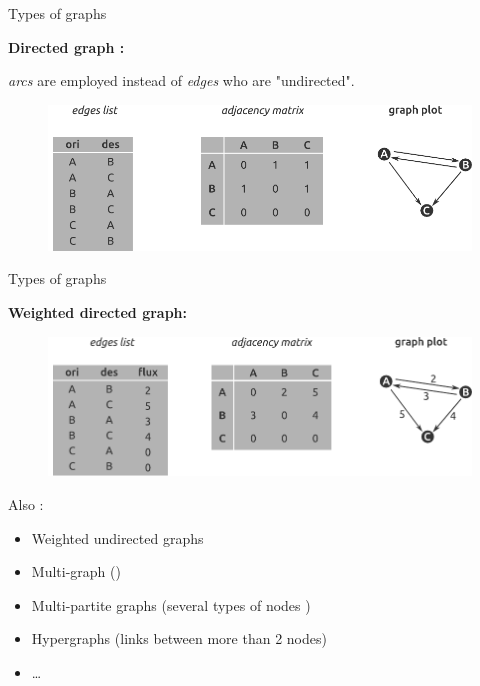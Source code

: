\begin{frame}{Types of graphs}

\textbf{Directed graph :}

\textit{arcs} are employed instead of \textit{edges} who are "undirected".

\begin{figure}
  \includegraphics[width=12cm]{MatGraph2_EN.pdf}
\end{figure}

\end{frame}



\begin{frame}{Types of graphs}

\textbf{Weighted directed graph:}

\begin{figure}
  \includegraphics[width=12cm]{MatGraph1_EN.pdf}
\end{figure}

Also :
\begin{itemize}
  \item Weighted undirected graphs
  \item Multi-graph ()
  \item Multi-partite graphs (several types of nodes )
  \item Hypergraphs (links between more than 2 nodes)
  \item \ldots
\end{itemize}

\end{frame}





